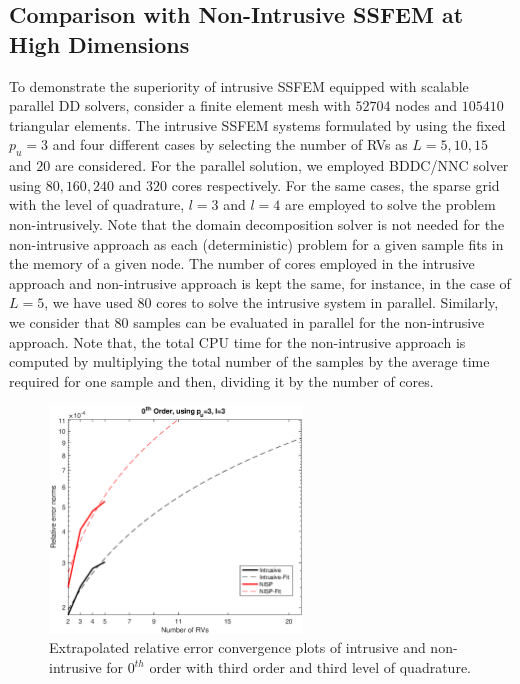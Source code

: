 \documentclass[letter,1p,11pt,oneside,onecolumn,sort&compress]{elsarticle}
\begin{document}
\subsection{Comparison with Non-Intrusive SSFEM at High Dimensions}
To demonstrate the superiority of intrusive SSFEM equipped with scalable parallel DD solvers, consider a finite element mesh with $52704$ nodes and $105410$ triangular elements.
The intrusive SSFEM systems formulated by using the fixed $p_{u}=3$ and four different cases by selecting the number of RVs as $L=5, 10, 15$ and $20$ are considered. For the parallel solution, we employed BDDC/NNC solver using $80, 160, 240$ and $320$ cores respectively.
For the same cases, the sparse grid with the level of quadrature, $l=3$ and $l=4$ are employed to solve the problem non-intrusively.
Note that the domain decomposition solver is not needed for the non-intrusive approach as each (deterministic) problem for a given sample fits in the memory of a given node.
The number of cores employed in the intrusive approach and non-intrusive approach is kept the same, for instance, in the case of $L=5$, we have used 80 cores to solve the intrusive system in parallel.
Similarly, we consider that 80 samples can be evaluated in parallel for the non-intrusive approach. Note that, the total CPU time for the non-intrusive approach is computed by multiplying the total number of the samples by the average time required for one sample and then, dividing it by the number of cores.

\begin{figure}[htbp]
 \centering
  \includegraphics[width=0.6\textwidth,height=0.3\textheight]{plots/errorFits.eps}
  \caption{Extrapolated relative error convergence plots of intrusive and non-intrusive for $0^{th}$ order with third order and third level of quadrature.}
   \label{fig:Dmesh_ib}
\end{figure}
\end{document}
